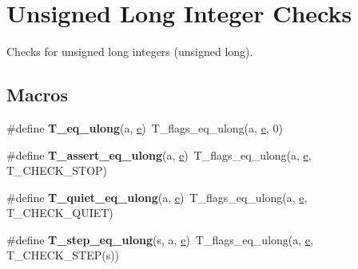 \hypertarget{group__RTEMSTestFrameworkChecksULong}{}\section{Unsigned Long Integer Checks}
\label{group__RTEMSTestFrameworkChecksULong}


Checks for unsigned long integers (unsigned long).  


\subsection*{Macros}
\begin{DoxyCompactItemize}
\item 
\mbox{\label{group__RTEMSTestFrameworkChecksULong_ga8a57a9188a17dcbbb2ba1e3e94bbd87f}} 
\#define {\bfseries T\+\_\+eq\+\_\+ulong}(a,  \mbox{\hyperlink{sun4u_2tte_8h_a8b0b9ed08e0e18920ec2682f48228c27}{e}})~T\+\_\+flags\+\_\+eq\+\_\+ulong(a, \mbox{\hyperlink{sun4u_2tte_8h_a8b0b9ed08e0e18920ec2682f48228c27}{e}}, 0)
\item 
\mbox{\label{group__RTEMSTestFrameworkChecksULong_ga4ab5f3c6313c95da70b76ad7d5831175}} 
\#define {\bfseries T\+\_\+assert\+\_\+eq\+\_\+ulong}(a,  \mbox{\hyperlink{sun4u_2tte_8h_a8b0b9ed08e0e18920ec2682f48228c27}{e}})~T\+\_\+flags\+\_\+eq\+\_\+ulong(a, \mbox{\hyperlink{sun4u_2tte_8h_a8b0b9ed08e0e18920ec2682f48228c27}{e}}, T\+\_\+\+C\+H\+E\+C\+K\+\_\+\+S\+T\+OP)
\item 
\mbox{\label{group__RTEMSTestFrameworkChecksULong_ga9a9bbaa704b8c8e3b29eb2660d69ec27}} 
\#define {\bfseries T\+\_\+quiet\+\_\+eq\+\_\+ulong}(a,  \mbox{\hyperlink{sun4u_2tte_8h_a8b0b9ed08e0e18920ec2682f48228c27}{e}})~T\+\_\+flags\+\_\+eq\+\_\+ulong(a, \mbox{\hyperlink{sun4u_2tte_8h_a8b0b9ed08e0e18920ec2682f48228c27}{e}}, T\+\_\+\+C\+H\+E\+C\+K\+\_\+\+Q\+U\+I\+ET)
\item 
\mbox{\label{group__RTEMSTestFrameworkChecksULong_ga1ced86e1cc02341630c6c15c46d23726}} 
\#define {\bfseries T\+\_\+step\+\_\+eq\+\_\+ulong}(s,  a,  \mbox{\hyperlink{sun4u_2tte_8h_a8b0b9ed08e0e18920ec2682f48228c27}{e}})~T\+\_\+flags\+\_\+eq\+\_\+ulong(a, \mbox{\hyperlink{sun4u_2tte_8h_a8b0b9ed08e0e18920ec2682f48228c27}{e}}, T\+\_\+\+C\+H\+E\+C\+K\+\_\+\+S\+T\+EP(s))

\end{DoxyCompactItemize}
